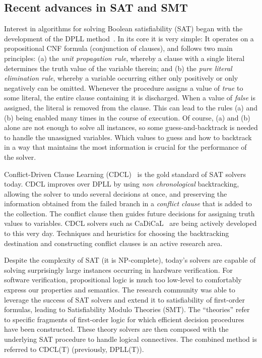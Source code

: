 \subsection{Recent advances in SAT and SMT}

Interest in algorithms for solving Boolean satisfiability (SAT) began with the development of the DPLL method~\cite{DPLL1,DPLL2}.
In its core it is very simple:
It operates on a propositional CNF formula (conjunction of clauses), and follows two main principles:
(a) the \emph{unit propagation rule}, whereby a clause with a single literal determines the truth value of the variable therein; and
(b) the \emph{pure literal elimination rule}, whereby a variable occurring either only positively or only negatively can be omitted.
Whenever the procedure assigns a value of \emph{true} to some literal, the entire clause containing it is discharged.
When a value of \emph{false} is assigned, the literal is removed from the clause.
This can lead to the rules (a) and (b) being enabled many times in the course of execution.
Of course, (a) and (b) alone are not enough to solve all instances, so some guess-and-backtrack is needed to handle the unassigned variables.
Which values to guess and how to backtrack in a way that maintains the most information is crucial for the performance of the solver.

Conflict-Driven Clause Learning (CDCL)~\cite{CDCL} is the gold standard of SAT solvers today.
CDCL improves over DPLL by using \emph{non chronological} backtracking, allowing the solver to undo several decisions at once, and preserving the information obtained from the failed branch in a \emph{conflict clause} that is added to the collection.
The conflict clause then guides future decisions for assigning truth values to variables.
CDCL solvers such as CaDiCaL~\cite{SAT2020:CaDiCaL} are being actively developed to this very day.
Techniques and heuristics for choosing the backtracking destination and constructing conflict clauses is an active research area.

Despite the complexity of SAT (it is NP-complete), today's solvers are capable of solving surprisingly large instances occurring in hardware verification.
For software verification, propositional logic is much too low-level to comfortably express our properties and semantics.
The research community was able to leverage the success of SAT solvers and extend it to satisfiability of first-order formulas, leading to Satisfiability Modulo Theories (SMT).
The ``theories'' refer to specific fragments of first-order logic for which efficient decision procedures have been constructed.
These theory solvers are then composed with the underlying SAT procedure to handle logical connectives.
The combined method is referred to CDCL(T) (previously, DPLL(T)).

